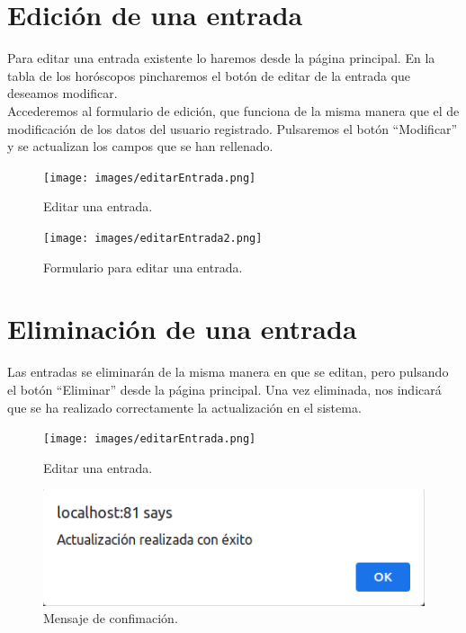 \documentclass[12pt, twoside]{report}
\begin{document}
\section{Edición de una entrada}
Para editar una entrada existente lo haremos desde la página principal. En la tabla de los horóscopos pincharemos el botón de editar de la entrada que deseamos modificar.\\
Accederemos al formulario de edición, que funciona de la misma manera que el de modificación de los datos del usuario registrado. Pulsaremos el botón ``Modificar'' y se actualizan los campos que se han rellenado.
\begin{figure}[h]
\begin{center}
\texttt{[image: images/editarEntrada.png]}
\end{center}
\caption{\label{inicio} Editar una entrada.}
\end{figure}
\begin{figure}[h]
\begin{center}
\texttt{[image: images/editarEntrada2.png]}
\end{center}
\caption{\label{inicio} Formulario para editar una entrada.}
\end{figure}
\clearpage

\section{Eliminación de una entrada}
Las entradas se eliminarán de la misma manera en que se editan, pero pulsando el botón ``Eliminar'' desde la página principal. Una vez eliminada, nos indicará que se ha realizado correctamente la actualización en el sistema.
\begin{figure}[h]
\begin{center}
\texttt{[image: images/editarEntrada.png]}
\end{center}
\caption{\label{inicio} Editar una entrada.}
\end{figure}
\begin{figure}[h]
\begin{center}
\includegraphics[scale=0.65]{images/actualización.png}
\end{center}
\caption{\label{inicio} Mensaje de confimación.}
\end{figure}
\clearpage
\end{document}
